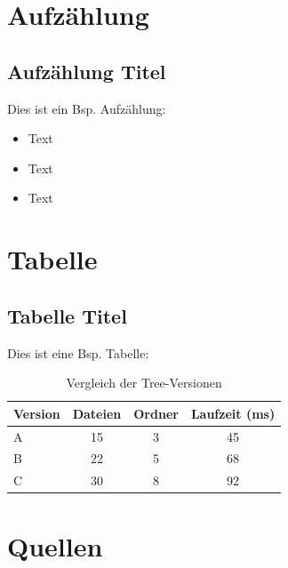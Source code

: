 
\section{Aufzählung}
\subsection{Aufzählung Titel}
Dies ist ein \acs{Bsp.} Aufzählung: \par\vspace\baselineskip
\begin{itemize}
    \item Text
    \item Text
    \item Text
\end{itemize}
\cleardoublepage


\section{Tabelle}
\subsection{Tabelle Titel}
Dies ist eine \acs{Bsp.} Tabelle: \par\vspace\baselineskip
\begin{table}[H]
    \centering
    \begin{tabular}{|l|c|c|c|}
        \hline
        \textbf{Version} & \textbf{Dateien} & \textbf{Ordner} & \textbf{Laufzeit (ms)} \\
        \hline
        A & 15 & 3 & 45 \\
        B & 22 & 5 & 68 \\
        C & 30 & 8 & 92 \\
        \hline
    \end{tabular}
    \caption{Vergleich der Tree-Versionen}
    \label{tab:tree-results}
\end{table}
\cleardoublepage


\section{Quellen}
